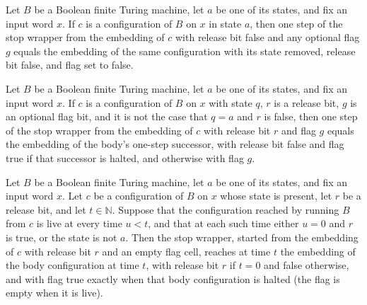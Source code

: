 \begin{lemma}
\label{Turing.FinTM.loopBody_stop}
\leanok
{}
Let $B$ be a Boolean finite Turing machine, let $a$ be one of its states, and fix an
input word $x$. If $c$ is a configuration of $B$ on $x$ in state $a$, then one step of
the stop wrapper from the embedding of $c$ with release bit false and any optional flag
$g$ equals the embedding of the same configuration with its state removed, release bit
false, and flag set to false.
\end{lemma}

\begin{lemma}
\label{Turing.FinTM.loopBody_step}
\leanok
{}
Let $B$ be a Boolean finite Turing machine, let $a$ be one of its states, and fix an
input word $x$. If $c$ is a configuration of $B$ on $x$ with state $q$, $r$ is a release
bit, $g$ is an optional flag bit, and it is not the case that $q=a$ and $r$ is false,
then one step of the stop wrapper from the embedding of $c$ with release bit $r$ and
flag $g$ equals the embedding of the body's one-step successor, with release bit false
and flag true if that successor is halted, and otherwise with flag $g$.
\end{lemma}

\begin{lemma}
\label{Turing.FinTM.loopBody_run}
\leanok
{}
Let $B$ be a Boolean finite Turing machine, let $a$ be one of its states, and fix an
input word $x$. Let $c$ be a configuration of $B$ on $x$ whose state is present, let $r$
be a release bit, and let $t\in\mathbb{N}$. Suppose that the configuration reached by
running $B$ from $c$ is live at every time $u<t$, and that at each such time either
$u=0$ and $r$ is true, or the state is not $a$. Then the stop wrapper, started from the
embedding of $c$ with release bit $r$ and an empty flag cell, reaches at time $t$ the
embedding of the body configuration at time $t$, with release bit $r$ if $t=0$ and false
otherwise, and with flag true exactly when that body configuration is halted (the flag
is empty when it is live).
\end{lemma}

